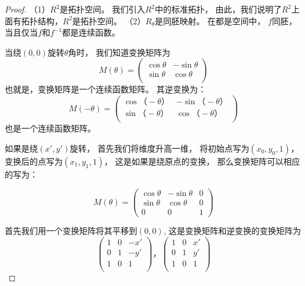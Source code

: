 \begin{proof}
（1）\(R^2\)是拓扑空间。
我们引入\(R^2\)中的标准拓扑，
由此，我们说明了\(R^2\)上面有拓扑结构，\(R^2\)是拓扑空间。
（2）\(R_{\theta}\)是同胚映射。
在都是空间中，
\(f\)同胚，
当且仅当\(f\)和\(f^{-1}\)都是连续函数。

当绕\((0,0)\)旋转\(\theta\)角时，
我们知道变换矩阵为
\[M(\theta)=
\left(
  \begin{array}{cc}
    \cos \theta & -\sin \theta \\
    \sin \theta & \cos \theta \\
  \end{array}
\right)\]
也就是，变换矩阵是一个连续函数矩阵。
其逆变换为：
\[M(-\theta)=
\left(
  \begin{array}{cc}
    \cos （- \theta） & -\sin （-\theta） \\
    \sin （-\theta） & \cos （-\theta） \\
  \end{array}
\right)\]
也是一个连续函数矩阵。

如果是绕\((x',y')\)旋转，
首先我们将维度升高一维，
将初始点写为\((x_0,y_0,1)\)，
变换后的点写为\((x_1,y_1,1)\)，
这是如果是绕原点的变换，
那么变换矩阵可以相应的写为：

\[M(\theta)=
\left(
  \begin{array}{ccc}
    \cos \theta & -\sin \theta & 0 \\
    \sin \theta & \cos \theta  & 0 \\
    0 & 0 & 1
  \end{array}
\right)\]

首先我们用一个变换矩阵将其平移到\((0,0)\),
这是变换矩阵和逆变换的变换矩阵为
\[\left(
  \begin{array}{ccc}
    1 & 0 & -x' \\
    0 & 1 & -y' \\
    1 & 0 & 1 \\
  \end{array}
\right)，
\left(
  \begin{array}{ccc}
    1 & 0 & x' \\
    0 & 1 & y' \\
    1 & 0 & 1 \\
  \end{array}
\right)\]


\end{proof}

